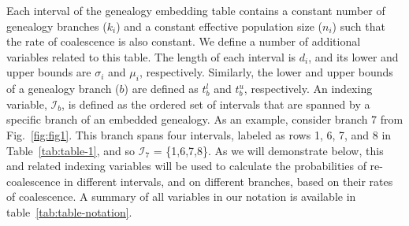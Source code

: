 \documentclass[11pt]{article}
\begin{document}
Each interval of the genealogy embedding table contains a constant number
of genealogy branches ($k_i$) and a constant effective population size 
($n_i$) such that the rate of coalescence is also constant.
We define a number of additional variables related to this table. 
The length of each interval is $d_i$, and its lower and upper bounds 
are $\sigma_i$ and $\mu_i$, respectively. Similarly, the lower and upper 
bounds of a genealogy branch ($b$) are defined as $t_b^l$ and $t_b^u$, 
respectively. 
An indexing variable, $\mathcal{I}_b$, is defined as the
ordered set of intervals that are spanned by a specific branch
of an embedded genealogy. As an example, consider branch 7 from 
Fig.~\ref{fig:fig1}. This branch spans four intervals, 
labeled as rows 1, 6, 7, and 8 in Table~\ref{tab:table-1}, 
and so $\mathcal{I}_7$ = \{1,6,7,8\}. As we will
demonstrate below, this and related indexing variables will be
used to calculate the probabilities of re-coalescence in different
intervals, and on different branches, based on their rates of 
coalescence.
A summary of all variables in our notation is available in 
table~\ref{tab:table-notation}. 

\end{document}
